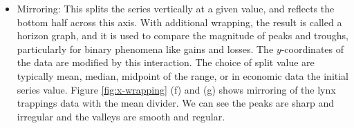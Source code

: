 \documentclass[12pt]{article}
\begin{document}
\begin{itemize}
\item Mirroring: This splits the series vertically at a given value,
  and reflects the bottom half across this axis. With additional
  wrapping, the result is called a horizon graph, and it is used to
compare the magnitude of peaks and troughs, particularly for binary
phenomena like gains and losses. The $y$-coordinates of the data are
modified by this interaction. The choice of split value are typically
mean, median, midpoint of the range, or in economic data the initial
series value. Figure \ref{fig:x-wrapping} (f) and (g) shows mirroring
of the lynx trappings data with the mean divider. We can see the peaks
are sharp and irregular and the valleys are smooth and regular.


\end{itemize}
\end{document}
